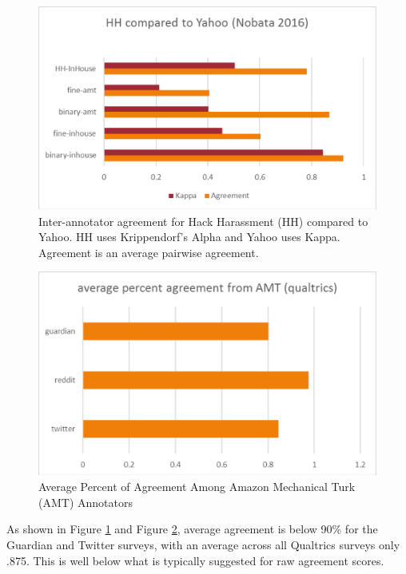 \documentclass[11pt,a4paper]{article}
\begin{document}
\begin{figure}
  \includegraphics[width=\linewidth]{figure2_iaa.png}
  \caption{Inter-annotator agreement for Hack Harassment (HH) compared to Yahoo. HH uses Krippendorf’s Alpha and Yahoo uses Kappa. Agreement is an average pairwise agreement.}
  \label{fig:iaa}
\end{figure}

\begin{figure}
  \includegraphics[width=\linewidth]{figure3_average_percent_agreement_amt.png}
  \caption{Average Percent of Agreement Among Amazon Mechanical Turk (AMT) Annotators}
  \label{fig:amt}
\end{figure}

As shown in Figure \ref{fig:iaa} and Figure \ref{fig:amt}, average agreement
is below 90\% for the Guardian and Twitter
surveys, with an average across all Qualtrics surveys
only .875. This is well below what is typically
suggested for raw agreement scores.
\end{document}
